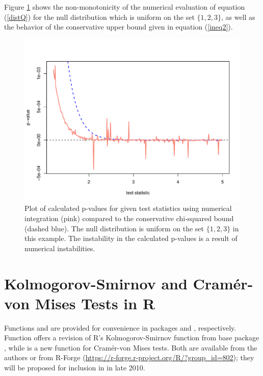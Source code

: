 Figure \ref{cvmissues} shows the non-monotonicity of the numerical
evaluation of equation (\ref{distQ}) for the null distribution which is
uniform on the set $\{1,2,3\}$, as well as the behavior of the
conservative upper bound given in equation (\ref{ineq2}).

\begin{figure}
\begin{center}
\includegraphics[scale=0.4]{fig1.pdf}
\end{center}
\caption{Plot of calculated p-values for given test statistics
using numerical integration
(pink) compared to the conservative chi-squared bound (dashed blue). 
The null distribution is uniform on the set $\{1,2,3\}$ in this example.
The instability in the calculated p-values is a result of numerical
instabilities.}
\label{cvmissues}
\end{figure}


\section{Kolmogorov-Smirnov and Cram\'{e}r-von Mises Tests in R}

Functions  and  are provided for
convenience in packages  and , respectively.
Function  offers a revision of
R's Kolmogorov-Smirnov function  from base
package , while  is a new
function for Cram\'{e}r-von Mises tests.
Both are available from the authors
or from R-Forge (\url{https://r-forge.r-project.org/R/?group_id=802});
they will be proposed for inclusion in  in late 2010.

